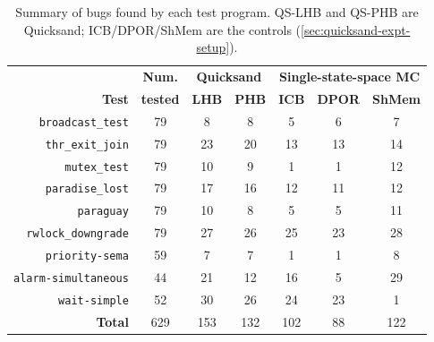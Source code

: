 \begin{table}[t]
	\begin{center}
	\small
	\begin{tabular}{r|c||c|c|c|c|c}
		& {\bf Num.} & \multicolumn{2}{c|}{\bf Quicksand} & \multicolumn{3}{c}{\bf {Single-state-space MC}}
		\\
		{\bf Test} & {\bf tested} & {\bf LHB} & {\bf PHB} & {\bf ICB} & {\bf DPOR} & {\bf ShMem}
		\\
		\hline
		{\tt broadcast\_test}    & 79  & 8   & 8   & 5   & 6   & 7   \\ %
		{\tt thr\_exit\_join}    & 79  & 23  & 20  & 13  & 13  & 14  \\ %
		{\tt mutex\_test}        & 79  & 10  & 9   & 1   & 1   & 12  \\ %
		{\tt paradise\_lost}     & 79  & 17  & 16  & 12  & 11  & 12  \\ %
		{\tt paraguay}           & 79  & 10  & 8   & 5   & 5   & 11  \\ %
		{\tt rwlock\_downgrade}  & 79  & 27  & 26  & 25  & 23  & 28  \\ %
		\hline
		{\tt priority-sema}      & 59  & 7   & 7   & 1   & 1   & 8   \\ %
		{\tt alarm-simultaneous} & 44  & 21  & 12  & 16  & 5   & 29  \\ %
		{\tt wait-simple}        & 52  & 30  & 26  & 24  & 23  & 1   \\ %
		\hline
		{\bf Total} & 629 & 153 & 132 & 102 & 88  & 122 \\ %
	\end{tabular}
	\end{center}
	\caption[Summary of bugs found by each test program.]
	{Summary of bugs
	found by each test program.
	QS-LHB and QS-PHB are Quicksand; ICB/DPOR/ShMem are the controls (\cref{sec:quicksand-expt-setup}).
	}
	\label{tab:drbugs}
\end{table}


